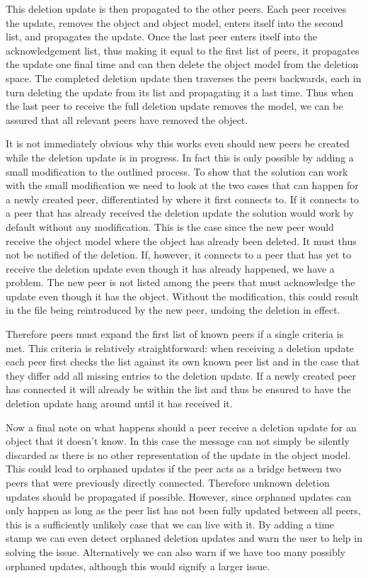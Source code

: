This deletion update is then propagated to the other peers.
Each peer receives the update, removes the object and object model, enters itself into the second list, and propagates the update.
Once the last peer enters itself into the acknowledgement list, thus making it equal to the first list of peers, it propagates the update one final time and can then delete the object model from the deletion space.
The completed deletion update then traverses the peers backwards, each in turn deleting the update from its list and propagating it a last time.
Thus when the last peer to receive the full deletion update removes the model, we can be assured that all relevant peers have removed the object.

It is not immediately obvious why this works even should new peers be created while the deletion update is in progress.
In fact this is only possible by adding a small modification to the outlined process.
To show that the solution can work with the small modification we need to look at the two cases that can happen for a newly created peer, differentiated by where it first connects to.
If it connects to a peer that has already received the deletion update the solution would work by default without any modification.
This is the case since the new peer would receive the object model where the object has already been deleted.
It must thus not be notified of the deletion.
If, however, it connects to a peer that has yet to receive the deletion update even though it has already happened, we have a problem.
The new peer is not listed among the peers that must acknowledge the update even though it has the object.
Without the modification, this could result in the file being reintroduced by the new peer, undoing the deletion in effect.

Therefore peers must expand the first list of known peers if a single criteria is met.
This criteria is relatively straightforward: when receiving a deletion update each peer first checks the list against its own known peer list and in the case that they differ add all missing entries to the deletion update.
If a newly created peer has connected it will already be within the list and thus be ensured to have the deletion update hang around until it has received it.

Now a final note on what happens should a peer receive a deletion update for an object that it doesn't know.
In this case the message can not simply be silently discarded as there is no other representation of the update in the object model.
This could lead to orphaned updates if the peer acts as a bridge between two peers that were previously directly connected.
Therefore unknown deletion updates should be propagated if possible.
However, since orphaned updates can only happen as long as the peer list has not been fully updated between all peers, this is a sufficiently unlikely case that we can live with it.
By adding a time stamp we can even detect orphaned deletion updates and warn the user to help in solving the issue.
Alternatively we can also warn if we have too many possibly orphaned updates, although this would signify a larger issue.

